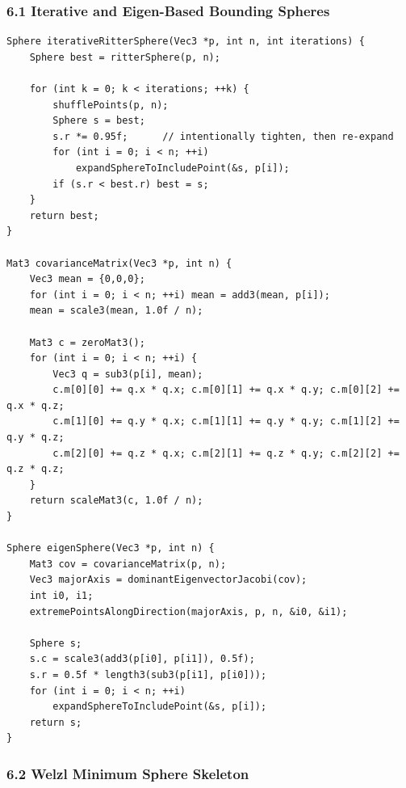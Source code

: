 \documentclass[10pt,letterpaper]{article}
\begin{document}
\subsubsection*{6.1 Iterative and Eigen-Based Bounding Spheres}

\begin{verbatim}
Sphere iterativeRitterSphere(Vec3 *p, int n, int iterations) {
    Sphere best = ritterSphere(p, n);

    for (int k = 0; k < iterations; ++k) {
        shufflePoints(p, n);
        Sphere s = best;
        s.r *= 0.95f;      // intentionally tighten, then re-expand
        for (int i = 0; i < n; ++i)
            expandSphereToIncludePoint(&s, p[i]);
        if (s.r < best.r) best = s;
    }
    return best;
}

Mat3 covarianceMatrix(Vec3 *p, int n) {
    Vec3 mean = {0,0,0};
    for (int i = 0; i < n; ++i) mean = add3(mean, p[i]);
    mean = scale3(mean, 1.0f / n);

    Mat3 c = zeroMat3();
    for (int i = 0; i < n; ++i) {
        Vec3 q = sub3(p[i], mean);
        c.m[0][0] += q.x * q.x; c.m[0][1] += q.x * q.y; c.m[0][2] += q.x * q.z;
        c.m[1][0] += q.y * q.x; c.m[1][1] += q.y * q.y; c.m[1][2] += q.y * q.z;
        c.m[2][0] += q.z * q.x; c.m[2][1] += q.z * q.y; c.m[2][2] += q.z * q.z;
    }
    return scaleMat3(c, 1.0f / n);
}

Sphere eigenSphere(Vec3 *p, int n) {
    Mat3 cov = covarianceMatrix(p, n);
    Vec3 majorAxis = dominantEigenvectorJacobi(cov);
    int i0, i1;
    extremePointsAlongDirection(majorAxis, p, n, &i0, &i1);

    Sphere s;
    s.c = scale3(add3(p[i0], p[i1]), 0.5f);
    s.r = 0.5f * length3(sub3(p[i1], p[i0]));
    for (int i = 0; i < n; ++i)
        expandSphereToIncludePoint(&s, p[i]);
    return s;
}
\end{verbatim}


\subsubsection*{6.2 Welzl Minimum Sphere Skeleton}
\end{document}
